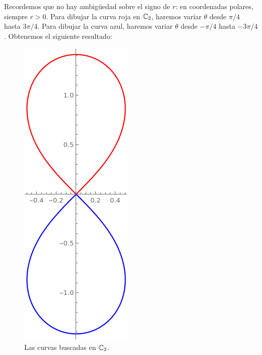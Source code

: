 \begin{solution}
Recordemos que no hay ambigüedad sobre el signo de $r$: en coordenadas polares, siempre $r > 0$. Para dibujar la curva roja en $\mathbb C_2$, haremos variar $\theta$ desde $\pi/4$ hasta $3\pi/4$. Para dibujar la curva azul, haremos variar $\theta$ desde $-\pi/4$ hasta $-3\pi/4$. Obtenemos el siguiente resultado:
\begin{figure}[h]
    \centering
    \includegraphics[scale=0.5]{c2.png}
    \caption{Las curvas buscadas en $\mathbb C_2$.}
\end{figure}
\end{solution}

